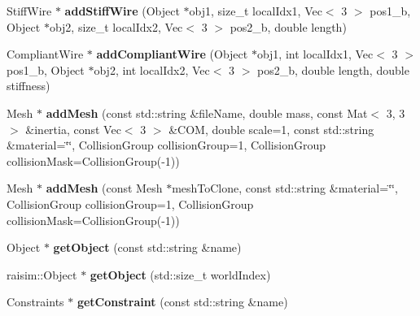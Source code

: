 \begin{DoxyCompactItemize}
\item 
\mbox{\label{classraisim_1_1World_ae67198fb2f946b9b2a1548a5e1cbfeda}} 
Stiff\+Wire $\ast$ {\bfseries add\+Stiff\+Wire} (Object $\ast$obj1, size\+\_\+t local\+Idx1, Vec$<$ 3 $>$ pos1\+\_\+b, Object $\ast$obj2, size\+\_\+t local\+Idx2, Vec$<$ 3 $>$ pos2\+\_\+b, double length)
\item 
\mbox{\label{classraisim_1_1World_ae23379d1376301b715840d851520ce47}} 
Compliant\+Wire $\ast$ {\bfseries add\+Compliant\+Wire} (Object $\ast$obj1, int local\+Idx1, Vec$<$ 3 $>$ pos1\+\_\+b, Object $\ast$obj2, int local\+Idx2, Vec$<$ 3 $>$ pos2\+\_\+b, double length, double stiffness)
\item 
\mbox{\label{classraisim_1_1World_a85043efc8376be1b14dae89f0a60640f}} 
Mesh $\ast$ {\bfseries add\+Mesh} (const std\+::string \&file\+Name, double mass, const Mat$<$ 3, 3 $>$ \&inertia, const Vec$<$ 3 $>$ \&C\+OM, double scale=1, const std\+::string \&material=\char`\"{}\char`\"{}, Collision\+Group collision\+Group=1, Collision\+Group collision\+Mask=Collision\+Group(-\/1))
\item 
\mbox{\label{classraisim_1_1World_ae57e4aae5001c43c5eb5c72bc575a8b3}} 
Mesh $\ast$ {\bfseries add\+Mesh} (const Mesh $\ast$mesh\+To\+Clone, const std\+::string \&material=\char`\"{}\char`\"{}, Collision\+Group collision\+Group=1, Collision\+Group collision\+Mask=Collision\+Group(-\/1))
\item 
\mbox{\label{classraisim_1_1World_ab6784aa7bcfc6211cefaeb5477420a66}} 
Object $\ast$ {\bfseries get\+Object} (const std\+::string \&name)
\item 
\mbox{\label{classraisim_1_1World_addb83f10662b1e62ee2053d5386ae9a5}} 
raisim\+::\+Object $\ast$ {\bfseries get\+Object} (std\+::size\+\_\+t world\+Index)
\item 
\mbox{\label{classraisim_1_1World_afd2f58fb526d2a7d1261958da079495b}} 
Constraints $\ast$ {\bfseries get\+Constraint} (const std\+::string \&name)
\item 
\mbox{\label{classraisim_1_1World_a64e73ad98af23f099c2eedbf743d1454}} 

\end{DoxyCompactItemize}
